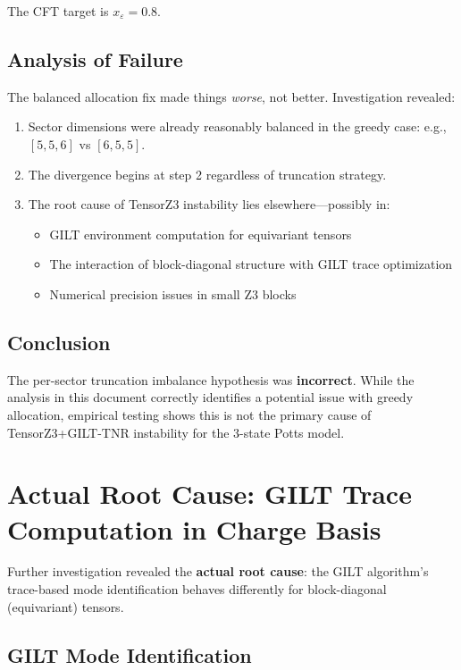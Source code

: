\documentclass{article}
\begin{document}
The CFT target is $x_\varepsilon = 0.8$.

\subsection{Analysis of Failure}

The balanced allocation fix made things \textit{worse}, not better. Investigation revealed:
\begin{enumerate}
    \item Sector dimensions were already reasonably balanced in the greedy case: e.g., $[5, 5, 6]$ vs $[6, 5, 5]$.
    \item The divergence begins at step 2 regardless of truncation strategy.
    \item The root cause of TensorZ3 instability lies elsewhere---possibly in:
    \begin{itemize}
        \item GILT environment computation for equivariant tensors
        \item The interaction of block-diagonal structure with GILT trace optimization
        \item Numerical precision issues in small Z3 blocks
    \end{itemize}
\end{enumerate}

\subsection{Conclusion}

The per-sector truncation imbalance hypothesis was \textbf{incorrect}. While the analysis in this document correctly identifies a potential issue with greedy allocation, empirical testing shows this is not the primary cause of TensorZ3+GILT-TNR instability for the 3-state Potts model.

\section{Actual Root Cause: GILT Trace Computation in Charge Basis}

Further investigation revealed the \textbf{actual root cause}: the GILT algorithm's trace-based mode identification behaves differently for block-diagonal (equivariant) tensors.

\subsection{GILT Mode Identification}
\end{document}
